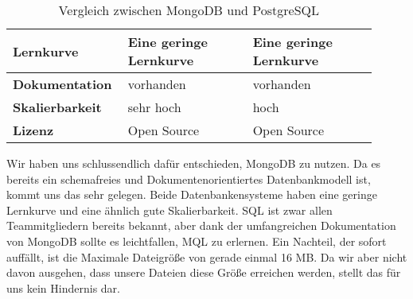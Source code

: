 \begin{center}
\begin{table}[H]
\begin{tabular}{|p{0.25\linewidth}|p{0.33\linewidth}|p{0.33\linewidth}|}
            \hline
            \textbf{Lernkurve}                        & \cellcolor{green!20}Eine geringe Lernkurve      & \cellcolor{green!20}Eine geringe Lernkurve                        \\
            \hline
            \textbf{Dokumentation}                    & \cellcolor{green!20}vorhanden                   & \cellcolor{green!20}vorhanden                                     \\
            \hline
            \textbf{Skalierbarkeit}                   & \cellcolor{green!20}sehr hoch                   & \cellcolor{yellow!20}hoch                                         \\
            \hline
            \textbf{Lizenz}                           & \cellcolor{green!20}Open Source                 & \cellcolor{green!20}Open Source                                   \\
            \hline
        \end{tabular}
        \caption{Vergleich zwischen MongoDB und PostgreSQL}
        \label{tab:Vergleich zwischen MongoDB und PostgreSQL}
    \end{table}
\end{center}

\noindent Wir haben uns schlussendlich dafür entschieden, MongoDB zu nutzen. 
Da es bereits ein schemafreies und Dokumentenorientiertes Datenbankmodell ist, kommt uns das sehr gelegen.
Beide Datenbankensysteme haben eine geringe Lernkurve und eine ähnlich gute Skalierbarkeit.
SQL ist zwar allen Teammitgliedern bereits bekannt, aber dank der umfangreichen Dokumentation von MongoDB sollte es leichtfallen, MQL zu erlernen.
Ein Nachteil, der sofort auffällt, ist die Maximale Dateigröße von gerade einmal 16 MB.
Da wir aber nicht davon ausgehen, dass unsere Dateien diese Größe erreichen werden, stellt das für uns kein Hindernis dar.